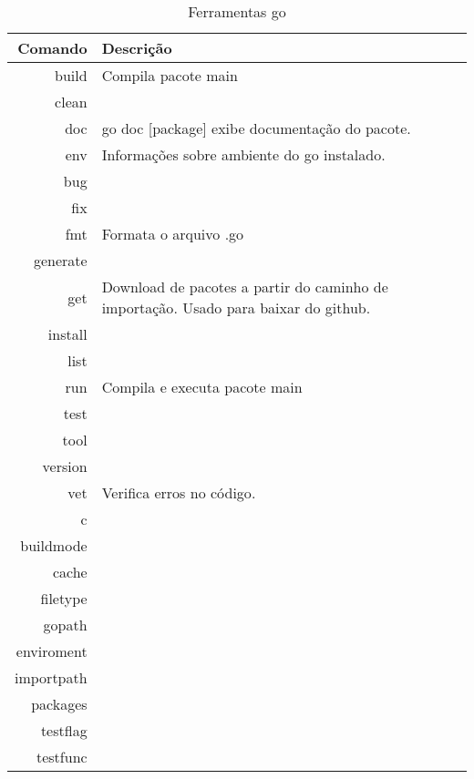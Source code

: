 \documentclass{apostila}
\begin{document}
\begin{table}[h]
    \centering
    \caption{Ferramentas go}
    \vspace{0.5cm}
    \begin{tabular}{r|l}

        Comando 	& Descrição	\\
        \hline
        build 		& Compila pacote main       \\
        clean		&  \\
        doc 		& go doc [package] exibe documentação do pacote\cite[78]{goia}.        \\
        env 		& Informações sobre ambiente do go instalado\cite[9]{cod3r}.       \\
        bug 		&        \\
        fix 		&        \\
        fmt 		& Formata o arquivo .go\cite[77]{goia}       \\
        generate 	&        \\
        get 		& Download de pacotes a partir do caminho de importação\cite[9]{cod3r}. Usado para baixar do github\cite[9]{cod3r}.       \\
        install 	&        \\
        list 		&        \\
        run 		& Compila e executa pacote main\cite[76]{goia}       \\
        test 		&       \\
        tool 		&       \\
        version 	&       \\
        vet 		& Verifica erros no código\cite[9]{cod3r}.  \\
        c			&       \\
        buildmode 	&       \\
        cache 		&       \\
        filetype 	&       \\
        gopath 		&       \\
        enviroment 	&       \\
        importpath 	&       \\
        packages    &       \\
        testflag    &       \\
        testfunc    & 

    \end{tabular}
\end{table}
\end{document}
